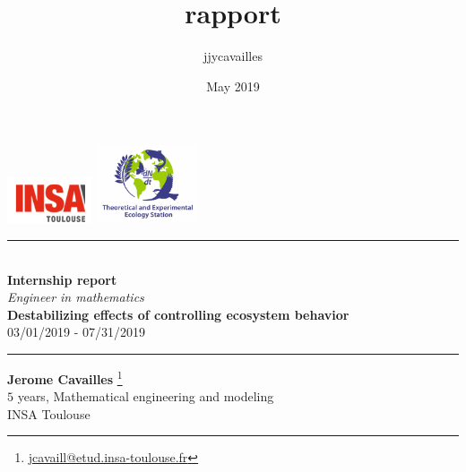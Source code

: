 \documentclass{article}
\title{rapport}
\author{jjycavailles }
\date{May 2019}
\begin{document}
\begin{titlepage}

\begin{center}
  \includegraphics[width = 25mm]{LogoInsa.png} \hfill
  \includegraphics[width = 30mm]{logo_cnrs.jpg}
\end{center}





\vspace*{1cm}

\begin{center}
\rule{\linewidth}{0.7mm} \\
[0.4cm]
\textbf{ \Huge Internship report} \\
[0.2cm]
\large \emph{Engineer in mathematics} \\ 
[0.6cm]
\textbf{ \huge Destabilizing effects of controlling ecosystem behavior} \\
[0.4cm]
03/01/2019 - 07/31/2019 \\
[0.4cm]
\rule{\linewidth}{0.7mm}
\end{center}

\vspace*{0.5cm}

\begin{center}
\textbf{\Large{Jerome Cavailles}} \footnote{\url{jcavaill@etud.insa-toulouse.fr}} \\ [0.3cm] $5$ years, Mathematical engineering and modeling \\ INSA Toulouse
\end{center}



\end{titlepage}
\end{document}
